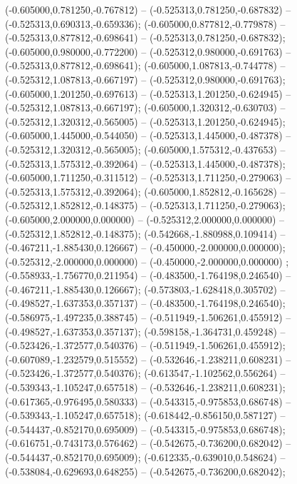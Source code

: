  (-0.605000,0.781250,-0.767812) -- (-0.525313,0.781250,-0.687832) -- (-0.525313,0.690313,-0.659336);
 (-0.605000,0.877812,-0.779878) -- (-0.525313,0.877812,-0.698641) -- (-0.525313,0.781250,-0.687832);
 (-0.605000,0.980000,-0.772200) -- (-0.525312,0.980000,-0.691763) -- (-0.525313,0.877812,-0.698641);
 (-0.605000,1.087813,-0.744778) -- (-0.525312,1.087813,-0.667197) -- (-0.525312,0.980000,-0.691763);
 (-0.605000,1.201250,-0.697613) -- (-0.525313,1.201250,-0.624945) -- (-0.525312,1.087813,-0.667197);
 (-0.605000,1.320312,-0.630703) -- (-0.525312,1.320312,-0.565005) -- (-0.525313,1.201250,-0.624945);
 (-0.605000,1.445000,-0.544050) -- (-0.525313,1.445000,-0.487378) -- (-0.525312,1.320312,-0.565005);
 (-0.605000,1.575312,-0.437653) -- (-0.525313,1.575312,-0.392064) -- (-0.525313,1.445000,-0.487378);
 (-0.605000,1.711250,-0.311512) -- (-0.525313,1.711250,-0.279063) -- (-0.525313,1.575312,-0.392064);
 (-0.605000,1.852812,-0.165628) -- (-0.525312,1.852812,-0.148375) -- (-0.525313,1.711250,-0.279063);
 (-0.605000,2.000000,0.000000) -- (-0.525312,2.000000,0.000000) -- (-0.525312,1.852812,-0.148375);
 (-0.542668,-1.880988,0.109414) -- (-0.467211,-1.885430,0.126667) -- (-0.450000,-2.000000,0.000000);
 (-0.525312,-2.000000,0.000000) -- (-0.450000,-2.000000,0.000000) ;
 (-0.558933,-1.756770,0.211954) -- (-0.483500,-1.764198,0.246540) -- (-0.467211,-1.885430,0.126667);
 (-0.573803,-1.628418,0.305702) -- (-0.498527,-1.637353,0.357137) -- (-0.483500,-1.764198,0.246540);
 (-0.586975,-1.497235,0.388745) -- (-0.511949,-1.506261,0.455912) -- (-0.498527,-1.637353,0.357137);
 (-0.598158,-1.364731,0.459248) -- (-0.523426,-1.372577,0.540376) -- (-0.511949,-1.506261,0.455912);
 (-0.607089,-1.232579,0.515552) -- (-0.532646,-1.238211,0.608231) -- (-0.523426,-1.372577,0.540376);
 (-0.613547,-1.102562,0.556264) -- (-0.539343,-1.105247,0.657518) -- (-0.532646,-1.238211,0.608231);
 (-0.617365,-0.976495,0.580333) -- (-0.543315,-0.975853,0.686748) -- (-0.539343,-1.105247,0.657518);
 (-0.618442,-0.856150,0.587127) -- (-0.544437,-0.852170,0.695009) -- (-0.543315,-0.975853,0.686748);
 (-0.616751,-0.743173,0.576462) -- (-0.542675,-0.736200,0.682042) -- (-0.544437,-0.852170,0.695009);
 (-0.612335,-0.639010,0.548624) -- (-0.538084,-0.629693,0.648255) -- (-0.542675,-0.736200,0.682042);
